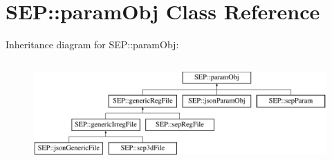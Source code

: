\hypertarget{class_s_e_p_1_1param_obj}{}\section{S\+EP\+:\+:param\+Obj Class Reference}
\label{class_s_e_p_1_1param_obj}
Inheritance diagram for S\+EP\+:\+:param\+Obj\+:\begin{figure}[H]
\begin{center}
\leavevmode
\includegraphics[height=3.971631cm]{class_s_e_p_1_1param_obj}
\end{center}
\end{figure}
